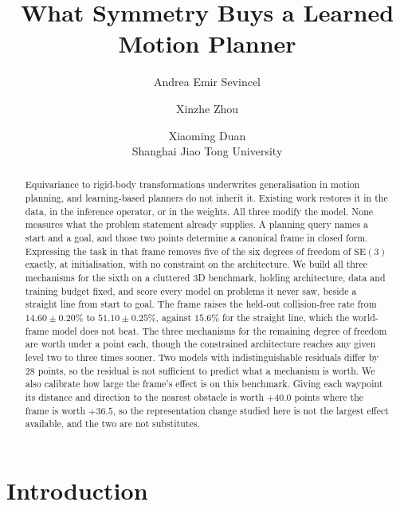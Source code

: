 \documentclass[10pt,twocolumn,letterpaper]{article}
\title{\vspace{-1.2cm}What Symmetry Buys a Learned Motion Planner}
\author{Andrea Emir Sevincel \and Xinzhe Zhou \and Xiaoming Duan\\
\small Shanghai Jiao Tong University}
\date{}
\newcommand{\SE}{\mathrm{SE}(3)}
\begin{document}
\maketitle

\begin{abstract}
\noindent
Equivariance to rigid-body transformations underwrites generalisation in
motion planning, and learning-based planners do not inherit it. Existing work
restores it in the data, in the inference operator, or in the weights. All three
modify the model. None measures what the problem statement already supplies. A
planning query names a start and a goal, and those two points determine a canonical frame
in closed form. Expressing the task in that frame removes five of the six degrees
of freedom of $\SE$ exactly, at initialisation, with no constraint on the
architecture. We build all three mechanisms for the sixth on a cluttered 3D
benchmark, holding architecture, data and training budget fixed, and score every
model on problems it never saw, beside a straight line from start to goal. The
frame raises the held-out collision-free rate from $14.60 \pm 0.20\%$ to
$51.10 \pm 0.25\%$, against $15.6\%$ for the straight line, which the world-frame
model does not beat. The three mechanisms for the remaining degree of freedom are
worth under a point each, though the constrained architecture
reaches any given level two to three times sooner. Two models with
indistinguishable residuals differ by $28$ points, so the residual is not
sufficient to predict what a mechanism is worth. We also calibrate how large the frame's
effect is on this benchmark. Giving each waypoint its distance and direction to
the nearest obstacle is worth $+40.0$ points where the frame is worth $+36.5$, so
the representation change studied here is not the largest effect available, and
the two are not substitutes.
\end{abstract}

\section{Introduction}
\end{document}
